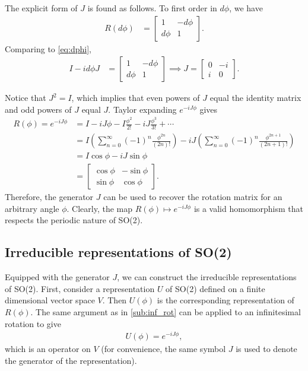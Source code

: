 The explicit form of $J$ is found as follows. To first order in $d\phi$, we have
\begin{align*}
    R(d\phi) &= \begin{bmatrix}
        1 & -d\phi \\
        d\phi & 1
    \end{bmatrix}.
\end{align*}
Comparing to \cref{eq:dphi},
\begin{align*}
    I - i d\phi J &= \begin{bmatrix}
        1 & -d\phi \\
        d\phi & 1
    \end{bmatrix} \implies J = \begin{bmatrix}
        0 & -i \\
        i & 0
    \end{bmatrix}.
\end{align*}

Notice that $J^2 = I$, which implies that even powers of $J$ equal the identity matrix and odd powers of $J$ equal $J$. Taylor expanding $e^{-iJ\phi }$ gives
\begin{align*}
    R(\phi) = e^{-iJ\phi} &= I - iJ\phi - I \frac{\phi^2}{2!} - iJ\frac{\phi^3}{3!} + \cdots \\
    &= I\left( \sum_{n=0}^{\infty} {(-1)}^n \frac{\phi^{2n}}{(2n)!} \right) - iJ\left( \sum_{n=0}^{\infty} {(-1)}^n \frac{\phi^{2n+1}}{(2n+1)!} \right) \\
    &= I\cos\phi - iJ\sin\phi \\
    &= \begin{bmatrix}
        \cos\phi & -\sin\phi \\
        \sin\phi & \cos\phi
    \end{bmatrix}.
\end{align*}
Therefore, the generator $J$ can be used to recover the rotation matrix for an arbitrary angle $\phi$. Clearly, the map $R(\phi)\mapsto e^{-iJ\phi}$ is a valid homomorphism that respects the periodic nature of SO(2).

\subsection{Irreducible representations of SO(2)}\label{sub:irr_so2}

Equipped with the generator $J$, we can construct the irreducible representations of SO(2). First, consider a representation $U$ of SO(2) defined on a finite dimensional vector space $V$. Then $U(\phi)$ is the corresponding representation of $R(\phi)$. The same argument as in \cref{sub:inf_rot} can be applied to an infinitesimal rotation to give
\begin{align*}
    U(\phi) = e^{-iJ\phi},
\end{align*}
which is an operator on $V$ (for convenience, the same symbol $J$ is used to denote the generator of the representation).

